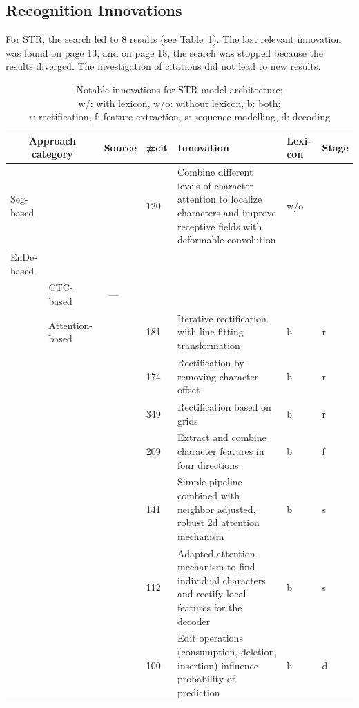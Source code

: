 \subsection{Recognition Innovations}
For \ac{STR}, the search led to 8 results (see Table~\ref{tb:STR-steps-properties}).
The last relevant innovation was found on page 13, and on page 18, the search was stopped because
the results diverged.
The investigation of citations did not lead to new results.
\begin{table}[ht]
    \centering\scriptsize
    \begin{tabular}{p{}p{}p{}p{}
            p{}p{}p{}}
        \multicolumn{2}{c}{Approach category} & Source & \#cit & Innovation & Lexi-con & Stage \\
        \toprule
        Seg-based & &~\cite{liao_scene_2018} & 120 & Combine different levels of character attention
            to localize characters and improve receptive fields with deformable convolution & w/o \\
        \midrule
        \ac{EnDe}-based & & & \\
            & CTC-based &~--- & & \\
            & Attention-based &~\cite{zhan_esir_2019} & 181 & Iterative rectification with line
                fitting transformation & b & r \\
            & &~\cite{luo_multi-object_2019} & 174 & Rectification by removing character offset &
                b & r \\
            & &~\cite{shi_aster_2019} & 349 & Rectification based on grids & b & r \\
            & &~\cite{cheng_aon_2018} & 209 & Extract and combine character features in four
                directions & b & f \\
            & &~\cite{li_show_2019} & 141 & Simple pipeline combined with neighbor adjusted, robust
                2d attention mechanism & b & s\\
            & &~\cite{liu_char-net_2018} & 112 & Adapted attention mechanism to find
                individual characters and rectify local features for the decoder & b & s \\
            & &~\cite{bai_edit_2018} & 100 & Edit operations (consumption, deletion, insertion)
                influence probability of prediction & b & d \\
        \bottomrule
    \end{tabular}
    \captionsetup{justification=centering}
    \caption[Notable innovations for STR model architecture]{%
        Notable innovations for STR model architecture; \\
        w/: with lexicon, w/o: without lexicon, b: both; \\
        r: rectification, f: feature extraction, s: sequence modelling,
        d: decoding\label{tb:STR-steps-properties}
    }
\end{table}

